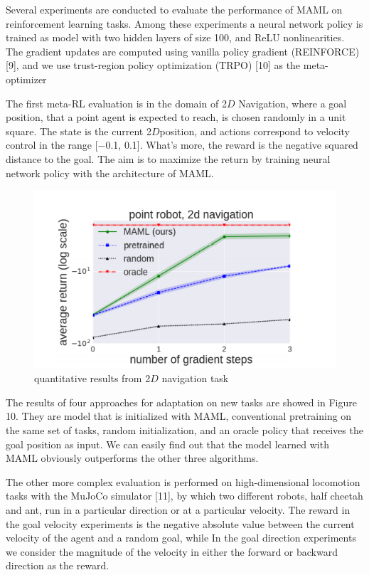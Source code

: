 Several experiments are conducted to evaluate the performance of MAML on reinforcement learning tasks. Among these experiments a neural network policy is trained as model with  two hidden layers of size 100, and ReLU nonlinearities. The gradient updates are computed using vanilla policy gradient (REINFORCE) [9], and we use trust-region policy optimization (TRPO) [10] as the meta-optimizer

The first meta-RL evaluation is in the domain of 2$D$ Navigation, where  a goal position, that a point agent is expected to reach, is chosen randomly in a unit square. The state is the current 2$D$position, and actions correspond to velocity control in the range [−0.1, 0.1]. What's more, the reward is the negative squared distance to the goal. The aim is to maximize the return by training neural network policy with the architecture of MAML.

\begin{figure}[H]
	\includegraphics[scale=0.8]{MAML_04.PNG}
	\centering
	\caption{ quantitative results from 2$D$ navigation task}
	\label{MAML}
\end{figure}

The results of four approaches for adaptation on new tasks are showed in Figure 10. They are model that is initialized with MAML, conventional pretraining on the same set of tasks, random initialization, and an oracle policy that receives the goal position as input. We can easily find out that the model learned with MAML obviously outperforms the other three algorithms.

The other more complex evaluation is performed on high-dimensional locomotion tasks with the MuJoCo simulator [11], by which two different robots, half  cheetah and ant, run in a particular direction or at a particular velocity. The reward in the goal velocity experiments is the negative absolute value between the current velocity of
the agent and a random goal, while In the goal direction experiments we consider the magnitude of the velocity in either the forward or backward direction as the reward.

